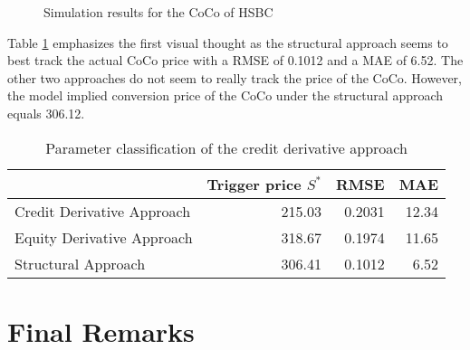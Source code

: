 \begin{figure}[H]
\centering
{}
\caption[Simulation results for the CoCo of HSBC]{Simulation results for the CoCo of HSBC}
\label{fig:valuation}
\end{figure}

Table \ref{tbl:valuationresults} emphasizes the first visual thought as the structural approach seems to best track the actual CoCo price with a RMSE of 0.1012 and a MAE of 6.52. The other two approaches do not seem to really track the price of the CoCo. However, the model implied conversion price of the CoCo under the structural approach equals 306.12.

\begin{table}[H]
	\setlength{\extrarowheight}{2.5pt}
	\centering
	\begin{tabular}{lrrr}
		\toprule
			 & \textbf{Trigger price $S^*$} & \textbf{RMSE} & \textbf{MAE} \\
		\midrule
			Credit Derivative Approach & 215.03 & 0.2031 & 12.34\\
			Equity Derivative Approach & 318.67 & 0.1974 & 11.65 \\			
			Structural Approach & 306.41 & 0.1012  & \phantom{1}6.52 \\
		\bottomrule
	\end{tabular}
	\caption[Case study results]{Parameter classification of the credit derivative approach}
	\label{tbl:valuationresults}
\end{table}


\section{Final Remarks}

